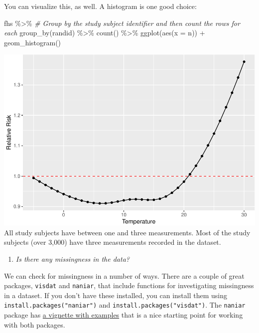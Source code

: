 \documentclass[
]{book}
\newenvironment{Shaded}{\begin{snugshade}}{\end{snugshade}}
\newcommand{\AttributeTok}[1]{\textcolor[rgb]{0.77,0.63,0.00}{#1}}
\newcommand{\CommentTok}[1]{\textcolor[rgb]{0.56,0.35,0.01}{\textit{#1}}}
\newcommand{\FunctionTok}[1]{\textcolor[rgb]{0.00,0.00,0.00}{#1}}
\newcommand{\NormalTok}[1]{#1}
\newcommand{\SpecialCharTok}[1]{\textcolor[rgb]{0.00,0.00,0.00}{#1}}
\providecommand{\tightlist}{%
  \setlength{\itemsep}{0pt}\setlength{\parskip}{0pt}}
\begin{document}
You can visualize this, as well. A histogram is one good choice:

\begin{Shaded}
\begin{Highlighting}[]
\NormalTok{fhs }\SpecialCharTok{\%\textgreater{}\%} 
  \CommentTok{\# Group by the study subject identifier and then count the rows for each}
  \FunctionTok{group\_by}\NormalTok{(randid) }\SpecialCharTok{\%\textgreater{}\%} 
  \FunctionTok{count}\NormalTok{() }\SpecialCharTok{\%\textgreater{}\%} 
  \FunctionTok{ggplot}\NormalTok{(}\FunctionTok{aes}\NormalTok{(}\AttributeTok{x =}\NormalTok{ n)) }\SpecialCharTok{+} 
  \FunctionTok{geom\_histogram}\NormalTok{()}
\end{Highlighting}
\end{Shaded}

\includegraphics{adv_epi_analysis_files/figure-latex/unnamed-chunk-73-1.pdf}
All study subjects have between one and three measurements. Most of the study
subjects (over 3,000) have three measurements recorded in the dataset.

\begin{enumerate}
\def\labelenumi{\arabic{enumi}.}
\setcounter{enumi}{1}
\tightlist
\item
  \emph{Is there any missingness in the data?}
\end{enumerate}

We can check for missingness in a number of ways. There are a couple of great
packages, \texttt{visdat} and \texttt{naniar}, that include functions for investigating
missingness in a dataset. If you don't have these installed, you can install
them using \texttt{install.packages("naniar")} and \texttt{install.packages("visdat")}. The
\texttt{naniar} package has \href{https://cran.r-project.org/web/packages/naniar/vignettes/getting-started-w-naniar.html}{a vignette with
examples}
that is a nice starting point for working with both packages.
\end{document}
